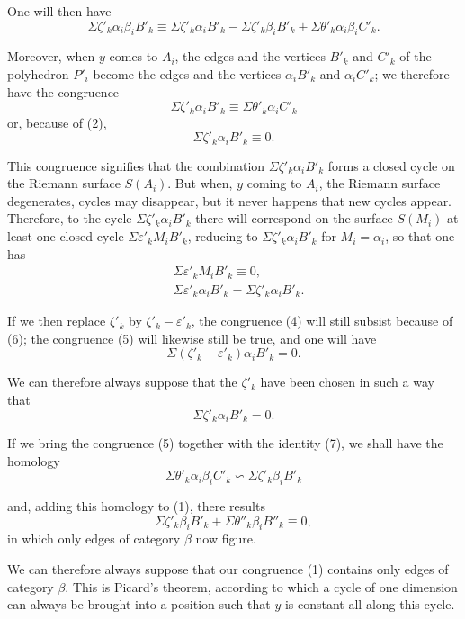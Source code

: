\documentclass{article}
\begin{document}

One will then have
\[ \Sigma \zeta'_{k} \alpha_{i}\beta_{i}B'_{k} \equiv \Sigma \zeta'_{k} \alpha_{i}B'_{k} - \Sigma \zeta'_{k} \beta_{i}B'_{k} + \Sigma \theta'_{k} \alpha_{i}\beta_{i}C'_{k}. \tag{5} \]

Moreover, when $y$ comes to $A_{i}$, the edges and the vertices $B'_{k}$ and $C'_{k}$ of the polyhedron $P'_{i}$ become the edges and the vertices $\alpha_{i}B'_{k}$ and $\alpha_{i}C'_{k}$; we therefore have the congruence
\[ \Sigma \zeta'_{k} \alpha_{i}B'_{k} \equiv \Sigma \theta'_{k} \alpha_{i}C'_{k} \]
or, because of (2),
\[ \Sigma \zeta'_{k} \alpha_{i}B'_{k} \equiv 0. \]

This congruence signifies that the combination $\Sigma \zeta'_{k} \alpha_{i}B'_{k}$ forms a closed cycle on the Riemann surface $S(A_{i})$. But when, $y$ coming to $A_{i}$, the Riemann surface degenerates, cycles may disappear, but it never happens that new cycles appear. Therefore, to the cycle $\Sigma \zeta'_{k} \alpha_{i}B'_{k}$ there will correspond on the surface $S(M_{i})$ at least one closed cycle $\Sigma \varepsilon'_{k} M_{i}B'_{k}$, reducing to $\Sigma \zeta'_{k} \alpha_{i}B'_{k}$ for $M_{i} = \alpha_{i}$, so that one has
\[ \begin{aligned} &\Sigma \varepsilon'_{k} M_{i}B'_{k} \equiv 0,\\ &\Sigma \varepsilon'_{k} \alpha_{i}B'_{k} = \Sigma \zeta'_{k} \alpha_{i}B'_{k}. \end{aligned} \tag{6} \]

If we then replace $\zeta'_{k}$ by $\zeta'_{k} - \varepsilon'_{k}$, the congruence (4) will still subsist because of (6); the congruence (5) will likewise still be true, and one will have
\[ \Sigma(\zeta'_{k} - \varepsilon'_{k})\alpha_{i}B'_{k} = 0. \]

We can therefore always suppose that the $\zeta'_{k}$ have been chosen in such a way that
\[ \Sigma \zeta'_{k} \alpha_{i}B'_{k} = 0. \tag{7} \]

If we bring the congruence (5) together with the identity (7), we shall have the homology
\[ \Sigma \theta'_{k} \alpha_{i}\beta_{i}C'_{k} \backsim \Sigma \zeta'_{k} \beta_{i}B'_{k} \tag{8} \]

and, adding this homology to (1), there results
\[ \Sigma \zeta'_{k} \beta_{i}B'_{k} + \Sigma \theta''_{k} \beta_{i}B''_{k} \equiv 0, \]
in which only edges of category $\beta$ now figure.

We can therefore always suppose that our congruence (1) contains only edges of category $\beta$. This is Picard's theorem, according to which a cycle of one dimension can always be brought into a position such that $y$ is constant all along this cycle.
\end{document}
